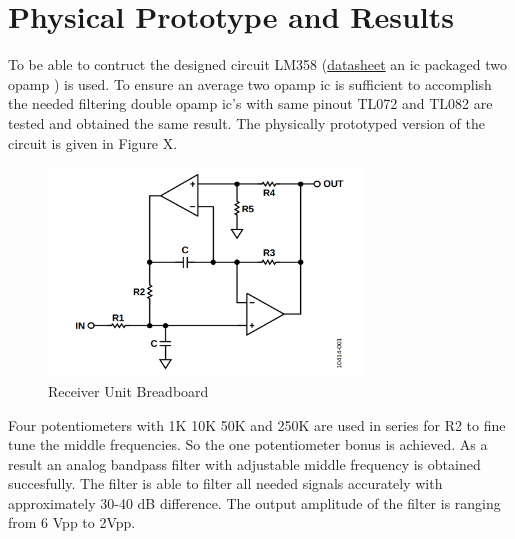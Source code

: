 \documentclass[letterpaper,12pt]{article}
\begin{document}
\section{Physical Prototype and Results}
To be able to contruct the designed circuit LM358 (\href{https://pdf.direnc.net/upload/lm358-datasheet.pdf}{datasheet} an ic packaged two opamp ) is used. To ensure an average two opamp ic is sufficient to accomplish the needed filtering double opamp ic's with same pinout TL072 and TL082 are tested and obtained the same result. The physically prototyped version of the circuit is given in Figure X.
\begin{figure}[H]
    \centering
    \includegraphics[width = 0.75\textwidth]{dualopamp.png}
    \caption{Receiver Unit Breadboard}
\end{figure}
Four potentiometers with 1K 10K 50K and 250K are used in series for R2 to fine tune the middle frequencies. So the one potentiometer bonus is achieved.
As a result an analog bandpass filter with adjustable middle frequency is obtained succesfully. The filter is able to filter all needed signals accurately with approximately 30-40 dB difference. The output amplitude of the filter is ranging from 6 Vpp to 2Vpp. 
\end{document}

